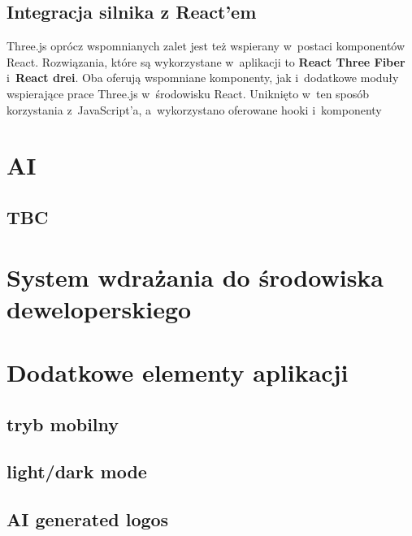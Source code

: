 \subsection{Integracja silnika z React'em}
Three.js oprócz wspomnianych zalet jest też wspierany w~postaci komponentów React.
Rozwiązania, które są wykorzystane w~aplikacji to \textbf{React Three Fiber}
i~\textbf{React drei}. Oba oferują wspomniane komponenty, jak i~dodatkowe moduły
wspierające prace Three.js w~środowisku React. Uniknięto w~ten sposób korzystania
z~JavaScript'a, a~wykorzystano oferowane hooki i~komponenty



\section{AI}

\subsection{TBC}


\section{System wdrażania do środowiska deweloperskiego}



\section{Dodatkowe elementy aplikacji}

\subsection{tryb mobilny}

\subsection{light/dark mode}

\subsection{AI generated logos}
